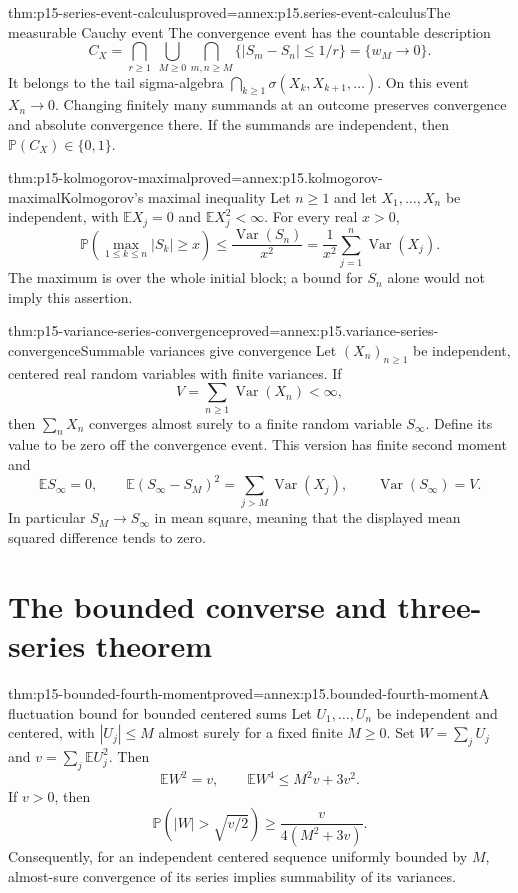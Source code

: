 \begin{hbtheorem}{thm:p15-series-event-calculus}{proved=annex:p15.series-event-calculus}{The measurable Cauchy event}
The convergence event has the countable description
\[
 C_X=\bigcap_{r\geq1}\ \bigcup_{M\geq0}
       \bigcap_{m,n\geq M}\{|S_m-S_n|\leq1/r\}
     =\{w_M\longrightarrow0\}.
\]
It belongs to the tail sigma-algebra
\(\bigcap_{k\geq1}\sigma(X_k,X_{k+1},\ldots)\).
On this event \(X_n\to0\). Changing finitely many summands at an
outcome preserves convergence and absolute convergence there.
If the summands are independent, then
\(\mathbb P(C_X)\in\{0,1\}\).
\end{hbtheorem}

\begin{hbtheorem}{thm:p15-kolmogorov-maximal}{proved=annex:p15.kolmogorov-maximal}{Kolmogorov's maximal inequality}
Let \(n\geq1\) and let \(X_1,\ldots,X_n\) be independent, with
\(\mathbb EX_j=0\) and \(\mathbb EX_j^2<\infty\).
For every real \(x>0\),
\[
 \mathbb P\!\left(\max_{1\leq k\leq n}|S_k|\geq x\right)
 \leq \frac{\operatorname{Var}(S_n)}{x^2}
 =\frac{1}{x^2}\sum_{j=1}^n\operatorname{Var}(X_j).
\]
The maximum is over the whole initial block; a bound for \(S_n\)
alone would not imply this assertion.
\end{hbtheorem}

\begin{hbtheorem}{thm:p15-variance-series-convergence}{proved=annex:p15.variance-series-convergence}{Summable variances give convergence}
Let \((X_n)_{n\geq1}\) be independent, centered real random variables
with finite variances. If
\[
 V=\sum_{n\geq1}\operatorname{Var}(X_n)<\infty,
\]
then \(\sum_nX_n\) converges almost surely to a finite random
variable \(S_\infty\). Define its value to be zero off the
convergence event. This version has finite second moment and
\[
 \mathbb ES_\infty=0,\qquad
 \mathbb E(S_\infty-S_M)^2
      =\sum_{j>M}\operatorname{Var}(X_j),\qquad
 \operatorname{Var}(S_\infty)=V.
\]
In particular \(S_M\to S_\infty\) in mean square, meaning that the
displayed mean squared difference tends to zero.
\end{hbtheorem}

\section{The bounded converse and three-series theorem}
\label{sec:p15-three-series}

\begin{hblemma}{thm:p15-bounded-fourth-moment}{proved=annex:p15.bounded-fourth-moment}{A fluctuation bound for bounded centered sums}
Let \(U_1,\ldots,U_n\) be independent and centered, with
\(|U_j|\leq M\) almost surely for a fixed finite \(M\geq0\).
Set \(W=\sum_jU_j\) and \(v=\sum_j\mathbb EU_j^2\).
Then
\[
 \mathbb EW^2=v,\qquad
 \mathbb EW^4\leq M^2v+3v^2.
\]
If \(v>0\), then
\[
 \mathbb P\!\left(|W|>\sqrt{v/2}\right)
       \geq\frac{v}{4(M^2+3v)}.
\]
Consequently, for an independent centered sequence uniformly bounded
by \(M\), almost-sure convergence of its series implies summability
of its variances.
\end{hblemma}

